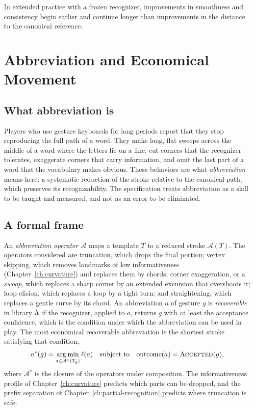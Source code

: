 \begin{hypothesis}\label{hyp:fluency}
In extended practice with a frozen recognizer, improvements in smoothness and consistency begin earlier and continue longer than improvements in the distance to the canonical reference.\evH
\end{hypothesis}

\chapter{Abbreviation and Economical Movement}\label{ch:abbreviation}

\section{What abbreviation is}

Players who use gesture keyboards for long periods report that they stop reproducing the full path of a word. They make long, flat sweeps across the middle of a word where the letters lie on a line, cut corners that the recognizer tolerates, exaggerate corners that carry information, and omit the last part of a word that the vocabulary makes obvious.\evO{} These behaviors are what \emph{abbreviation} means here: a systematic reduction of the stroke relative to the canonical path, which preserves its recognizability. The specification treats abbreviation as a skill to be taught and measured, and not as an error to be eliminated.

\section{A formal frame}

An \emph{abbreviation operator} $\mathcal A$ maps a template $T$ to a reduced stroke $\mathcal A(T)$. The operators considered are truncation, which drops the final portion; vertex skipping, which removes landmarks of low informativeness (Chapter~\ref{ch:curvature}) and replaces them by chords; corner exaggeration, or a \emph{swoop}, which replaces a sharp corner by an extended excursion that overshoots it; loop elision, which replaces a loop by a tight turn; and straightening, which replaces a gentle curve by its chord. An abbreviation $a$ of gesture $g$ is \emph{recoverable} in library $\Lambda$ if the recognizer, applied to $a$, returns $g$ with at least the acceptance confidence, which is the condition under which the abbreviation can be used in play. The most economical recoverable abbreviation is the shortest stroke satisfying that condition,
\[
a^{\ast}(g)=\operatorname*{arg\,min}_{a\in\mathcal A^{\ast}(T_g)}\ell(a)\quad\text{subject to}\quad \text{outcome}(a)=\textsc{Accepted}(g),
\]
where $\mathcal A^{\ast}$ is the closure of the operators under composition. The informativeness profile of Chapter~\ref{ch:curvature} predicts which parts can be dropped, and the prefix separation of Chapter~\ref{ch:partial-recognition} predicts where truncation is safe.

